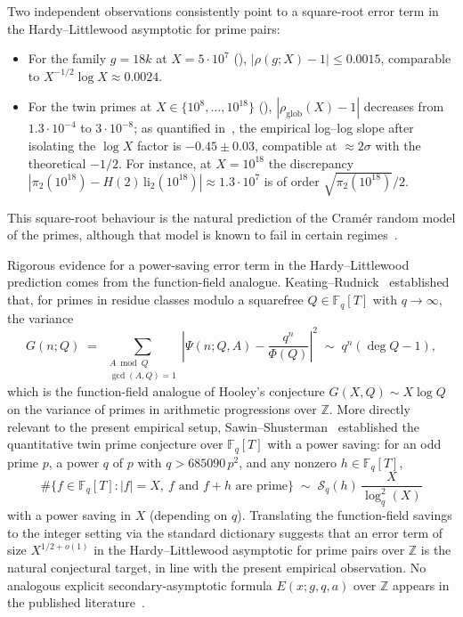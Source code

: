 \documentclass[11pt]{amsart}
\theoremstyle{plain}
\theoremstyle{definition}
\theoremstyle{remark}
\begin{document}
Two independent observations consistently point to a square-root
error term in the Hardy--Littlewood asymptotic for prime pairs:
\begin{itemize}
\item For the family $g = 18k$ at $X = 5 \cdot 10^7$
  (), $|\rho(g; X) - 1| \le 0.0015$, comparable
  to $X^{-1/2}\log X \approx 0.0024$.
\item For the twin primes at $X \in \{10^8,\ldots,10^{18}\}$
  (), $|\rho_{\mathrm{glob}}(X) - 1|$
  decreases from $1.3 \cdot 10^{-4}$ to $3 \cdot 10^{-8}$; as quantified
  in~, the empirical log--log slope after
  isolating the $\log X$ factor is $-0.45 \pm 0.03$, compatible at
  $\approx 2\sigma$ with the theoretical $-1/2$. For instance, at
  $X = 10^{18}$ the discrepancy
  $|\pi_2(10^{18}) - H(2)\,\mathrm{li}_2(10^{18})| \approx 1.3 \cdot 10^7$
  is of order $\sqrt{\pi_2(10^{18})}/2$.
\end{itemize}
This square-root behaviour is the natural prediction of the
Cram\'er random model of the primes, although that model is known to
fail in certain regimes~\cite{Maier85}.

Rigorous evidence for a power-saving error term in the
Hardy--Littlewood prediction comes from the function-field analogue.
Keating--Rudnick~\cite{KR14} established that, for primes in residue
classes modulo a squarefree $Q \in \mathbb{F}_q[T]$ with $q \to
\infty$, the variance
\[
  G(n; Q) \;=\; \sum_{\substack{A \bmod Q \\ \gcd(A,Q)=1}}
  \left|\Psi(n; Q, A) - \frac{q^n}{\Phi(Q)}\right|^2
  \;\sim\; q^n (\deg Q - 1),
\]
which is the function-field analogue of Hooley's conjecture
$G(X, Q) \sim X \log Q$ on the variance of primes in arithmetic
progressions over $\mathbb{Z}$. More directly relevant to the present
empirical setup, Sawin--Shusterman~\cite[Theorem 1.1]{SS22}
established the quantitative twin prime conjecture over
$\mathbb{F}_q[T]$ with a power saving: for an odd prime $p$, a power
$q$ of $p$ with $q > 685090\, p^2$, and any nonzero
$h \in \mathbb{F}_q[T]$,
\[
  \#\{f \in \mathbb{F}_q[T] : |f| = X,\ f\text{ and } f+h
  \text{ are prime}\}
  \;\sim\; \mathcal{S}_q(h)\, \frac{X}{\log_q^2(X)}
\]
with a power saving in $X$ (depending on $q$). Translating the
function-field savings to the integer setting via the standard
dictionary suggests that an error term of size $X^{1/2 + o(1)}$ in
the Hardy--Littlewood asymptotic for prime pairs over $\mathbb{Z}$ is
the natural conjectural target, in line with the present empirical
observation. No analogous explicit secondary-asymptotic formula
$E(x; g, q, a)$ over $\mathbb{Z}$ appears in the published
literature~\cite{MOQ}.
\end{document}
